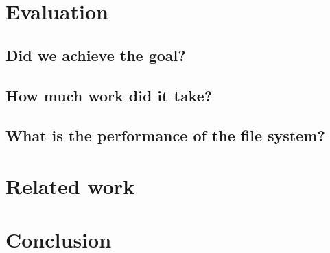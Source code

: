 \documentclass[onecolumn]{paper}
\begin{document}
\section{Evaluation}
	\subsection{Did we achieve the goal?}
	\subsection{How much work did it take?}
	\subsection{What is the performance of the file system?}

\section{Related work}

\section{Conclusion}
\end{document}
